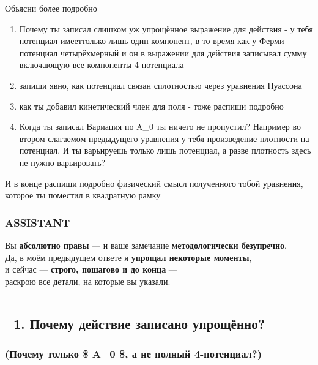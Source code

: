 \documentclass[11pt]{article}
\begin{document}
Обьясни более подробно

\begin{enumerate}
\def\labelenumi{\arabic{enumi})}
\item
  Почему ты записал слишком уж упрощённое выражение для действия - у
  тебя потенциал имееттолько лишь один компонент, в то время как у Ферми
  потенциал четырёхмерный и он в выражении для действия записывал сумму
  включающую все компоненты 4-потенциала
\item
  запиши явно, как потенциал связан сплотностью через уравнения Пуассона
\item
  как ты добавил кинетический член для поля - тоже распиши подробно
\item
  Когда ты записал Вариация по A\_0 ты ничего не пропустил? Например во
  втором слагаемом предыдущего уравнения у тебя произведение плотности
  на потенциал. И ты варьируешь только лишь потенциал, а разве плотность
  здесь не нужно варьировать?
\end{enumerate}

И в конце распиши подробно физический смысл полученного тобой уравнения,
которое ты поместил в квадратную рамку

\subsubsection{ASSISTANT}\label{assistant-6}

Вы \textbf{абсолютно правы} --- и ваше замечание \textbf{методологически
безупречно}.\\
Да, в моём предыдущем ответе я \textbf{упрощал некоторые моменты},\\
и сейчас --- \textbf{строго, пошагово и до конца} ---\\
раскрою все детали, на которые вы указали.

\begin{center}\rule{0.5\linewidth}{\linethickness}\end{center}

\subsection{🔹 1. Почему действие записано
упрощённо?}\label{ux43fux43eux447ux435ux43cux443-ux434ux435ux439ux441ux442ux432ux438ux435-ux437ux430ux43fux438ux441ux430ux43dux43e-ux443ux43fux440ux43eux449ux451ux43dux43dux43e}

\subsubsection{(Почему только \$ A\_0 \$, а не полный
4-потенциал?)}\label{ux43fux43eux447ux435ux43cux443-ux442ux43eux43bux44cux43aux43e-a_0-ux430-ux43dux435-ux43fux43eux43bux43dux44bux439-4-ux43fux43eux442ux435ux43dux446ux438ux430ux43b}
\end{document}
